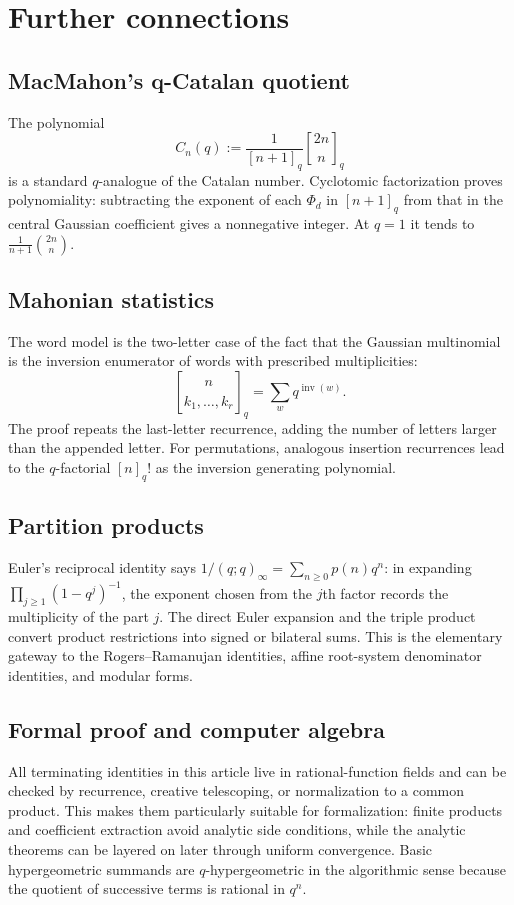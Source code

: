 \documentclass[11pt]{article}
\numberwithin{equation}{section}
\theoremstyle{definition}
\newcommand{\inv}{\operatorname{inv}}
\begin{document}
\section{Further connections}
\subsection{MacMahon's q-Catalan quotient}
The polynomial
\[
C_n(q):=\frac1{[n+1]_q}\genfrac{[}{]}{0pt}{}{2n}{n}_q
\]
is a standard $q$-analogue of the Catalan number.  Cyclotomic factorization proves polynomiality: subtracting the exponent of each $\Phi_d$ in $[n+1]_q$ from that in the central Gaussian coefficient gives a nonnegative integer.  At $q=1$ it tends to $\frac1{n+1}\binom{2n}{n}$.

\subsection{Mahonian statistics}
The word model is the two-letter case of the fact that the Gaussian multinomial is the inversion enumerator of words with prescribed multiplicities:
\[
\genfrac{[}{]}{0pt}{}{n}{k_1,\ldots,k_r}_q
=\sum_w q^{\inv(w)}.
\]
The proof repeats the last-letter recurrence, adding the number of letters larger than the appended letter.  For permutations, analogous insertion recurrences lead to the $q$-factorial $[n]_q!$ as the inversion generating polynomial.

\subsection{Partition products}
Euler's reciprocal identity says $1/(q;q)_\infty=\sum_{n\ge0}p(n)q^n$: in expanding $\prod_{j\ge1}(1-q^j)^{-1}$, the exponent chosen from the $j$th factor records the multiplicity of the part $j$.  The direct Euler expansion and the triple product convert product restrictions into signed or bilateral sums.  This is the elementary gateway to the Rogers--Ramanujan identities, affine root-system denominator identities, and modular forms.

\subsection{Formal proof and computer algebra}
All terminating identities in this article live in rational-function fields and can be checked by recurrence, creative telescoping, or normalization to a common product.  This makes them particularly suitable for formalization: finite products and coefficient extraction avoid analytic side conditions, while the analytic theorems can be layered on later through uniform convergence.  Basic hypergeometric summands are $q$-hypergeometric in the algorithmic sense because the quotient of successive terms is rational in $q^n$.
\end{document}
